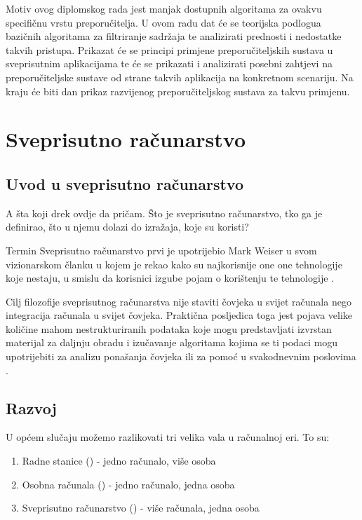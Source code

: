 \documentclass[times, utf8, diplomski, numeric]{fer}
\begin{document}
Motiv ovog diplomskog rada jest manjak dostupnih algoritama za ovakvu
specifičnu vrstu preporučitelja. U ovom radu dat će se teorijska
podlogua bazičnih algoritama za filtriranje sadržaja te analizirati prednosti i
nedostatke takvih pristupa. Prikazat će se principi primjene preporučiteljskih
sustava u sveprisutnim aplikacijama te će se prikazati i analizirati posebni
zahtjevi na preporučiteljske sustave od strane takvih aplikacija na konkretnom
scenariju. Na kraju će biti dan prikaz razvijenog preporučiteljskog sustava za
takvu primjenu.

\chapter{Sveprisutno računarstvo}
\section{Uvod u sveprisutno računarstvo}
A šta koji drek ovdje da pričam. Što je sveprisutno računarstvo, tko ga je
definirao, što u njemu dolazi do izražaja, koje su koristi?

Termin \glqq Sveprisutno računarstvo \grqq prvi je upotrijebio Mark Weiser u
svom vizionarskom članku u kojem je rekao kako su najkorisnije
one one tehnologije koje nestaju, u smislu da korisnici izgube pojam o
korištenju te tehnologije \cite{computer21}. 

Cilj filozofije sveprisutnog računarstva nije staviti čovjeka u svijet računala
nego integracija računala u svijet čovjeka. Praktična posljedica toga jest
pojava velike količine mahom nestrukturiranih podataka koje mogu predstavljati
izvrstan materijal za daljnju obradu i izučavanje algoritama kojima se ti podaci
mogu upotrijebiti za analizu ponašanja čovjeka ili za pomoć u svakodnevnim
poslovima \cite{VukoticTankovic}.



\section{Razvoj}
U općem slučaju možemo razlikovati tri velika vala u računalnoj eri. To su:
\begin{enumerate}
  \item Radne stanice () - jedno računalo, više osoba
  \item Osobna računala () - jedno računalo, jedna
  osoba
  \item Sveprisutno računarstvo () - više računala,
  jedna osoba
\end{enumerate}
\end{document}
